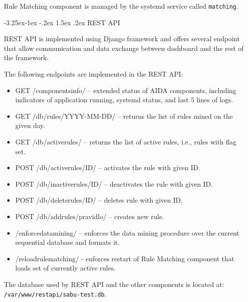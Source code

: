 \documentclass[a4paper]{article} %
\makeatletter
\renewcommand\subsection{\@startsection{subsection}{2}{\z@}%
                   {-3.25ex\@plus -1ex \@minus -.2ex}%
                   {1.5ex \@plus .2ex}%
                   {\normalfont\sffamily\large\bfseries\color{projectcolor}}}
\makeatother
\begin{document}
Rule Matching component is managed by the systemd service called \texttt{matching}.

% 

\subsection{REST API}

REST API is implemented using Django framework and offers several endpoint that allow communication and data exchange between dashboard and the rest of the framework. 

The following endpoints are implemented in the REST API:
\begin{itemize}[nolistsep,noitemsep]
  \item GET /componentsinfo/ -- extended status of AIDA components, including indicators of application running, systemd status, and last 5 lines of logs.
  \item GET /db/rules/YYYY-MM-DD/ -- returns the list of rules mined on the given day.
  \item GET /db/activerules/ -- returns the list of active rules, i.e., rules with  flag set.
  \item POST /db/activerules/ID/ -- activates the rule with given ID.
  \item POST /db/inactiverules/ID/ -- deactivates the rule with given ID.
  \item POST /db/deleterules/ID/ -- deletes rule with given ID.
  \item POST /db/addrules/pravidlo/ -- creates new rule.
  \item /enforcedatamining/ -- enforces the data mining procedure over the current sequential database and formats it.
  \item /reloadrulematching/ - enforces restart of Rule Matching component that loads set of currently active rules.
\end{itemize}

The database used by REST API and the other components is located at: \texttt{/var/www/restapi/sabu-test.db}.

% 
\end{document}
